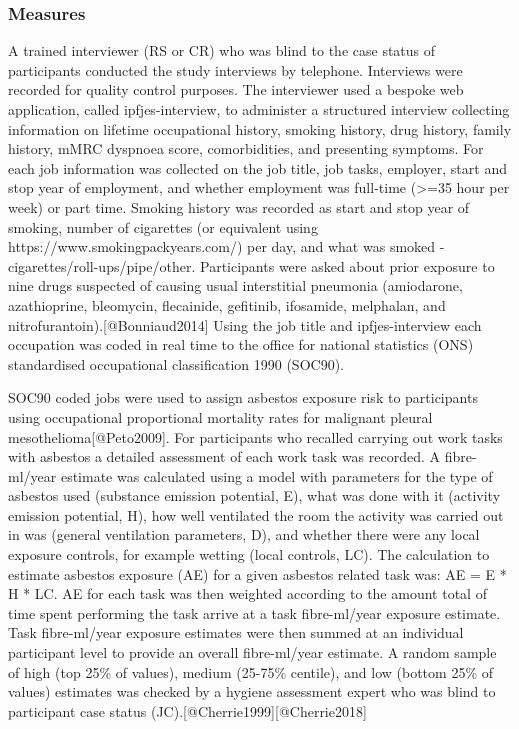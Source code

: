 \documentclass[
]{article}
\begin{document}
\hypertarget{measures}{%
\subsubsection{Measures}\label{measures}}

A trained interviewer (RS or CR) who was blind to the case status of
participants conducted the study interviews by telephone. Interviews
were recorded for quality control purposes. The interviewer used a
bespoke web application, called ipfjes-interview, to administer a
structured interview collecting information on lifetime occupational
history, smoking history, drug history, family history, mMRC dyspnoea
score, comorbidities, and presenting symptoms. For each job information
was collected on the job title, job tasks, employer, start and stop year
of employment, and whether employment was full-time (\textgreater=35
hour per week) or part time. Smoking history was recorded as start and
stop year of smoking, number of cigarettes (or equivalent using
https://www.smokingpackyears.com/) per day, and what was smoked -
cigarettes/roll-ups/pipe/other. Participants were asked about prior
exposure to nine drugs suspected of causing usual interstitial pneumonia
(amiodarone, azathioprine, bleomycin, flecainide, gefitinib, ifosamide,
melphalan, and nitrofurantoin).{[}@Bonniaud2014{]} Using the job title
and ipfjes-interview each occupation was coded in real time to the
office for national statistics (ONS) standardised occupational
classification 1990 (SOC90).

SOC90 coded jobs were used to assign asbestos exposure risk to
participants using occupational proportional mortality rates for
malignant pleural mesothelioma{[}@Peto2009{]}. For participants who
recalled carrying out work tasks with asbestos a detailed assessment of
each work task was recorded. A fibre-ml/year estimate was calculated
using a model with parameters for the type of asbestos used (substance
emission potential, E), what was done with it (activity emission
potential, H), how well ventilated the room the activity was carried out
in was (general ventilation parameters, D), and whether there were any
local exposure controls, for example wetting (local controls, LC). The
calculation to estimate asbestos exposure (AE) for a given asbestos
related task was: AE = E * H * LC. AE for each task was then weighted
according to the amount total of time spent performing the task arrive
at a task fibre-ml/year exposure estimate. Task fibre-ml/year exposure
estimates were then summed at an individual participant level to provide
an overall fibre-ml/year estimate. A random sample of high (top 25\% of
values), medium (25-75\% centile), and low (bottom 25\% of values)
estimates was checked by a hygiene assessment expert who was blind to
participant case status (JC).{[}@Cherrie1999{]}{[}@Cherrie2018{]}
\end{document}
